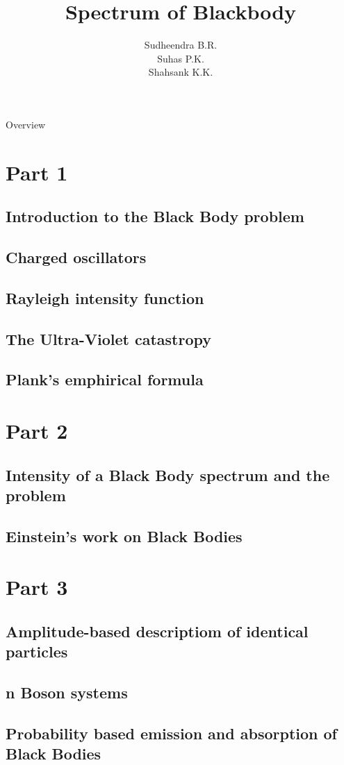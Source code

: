 \documentclass[aspectratio=169]{beamer}
\title{Spectrum of Blackbody}
\institute{Yuvaraja's College, Mysuru}
\author{Sudheendra B.R. \\ Suhas P.K. \\ Shahsank K.K.}
\date{}
\begin{document}
\begin{frame}[noframenumbering]
\titlepage
\end{frame}

\begin{frame}[noframenumbering]{Overview}
\tableofcontents
\end{frame}

\section{Part 1}
\subsection{Introduction to the Black Body problem} 
 
\subsection{Charged oscillators}
 
\subsection{Rayleigh intensity function}
 
\subsection{The Ultra-Violet catastropy} 

\subsection{Plank's emphirical formula}

\section{Part 2}
\subsection{Intensity of a Black Body spectrum and the problem}

\subsection{Einstein's work on Black Bodies}

\section{Part 3}
\subsection{Amplitude-based descriptiom of identical particles}

\subsection{n Boson systems}

\subsection{Probability based emission and absorption of Black Bodies}
\end{document}
